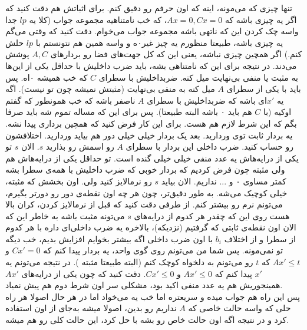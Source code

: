 تنها چیزی که می‌مونه، اینه که اون حرفم رو دقیق کنم. برای اثباتش هم دقت کنید که اگر یه چیزی باشه که $Ax=0, Cx=0$، که خب نامتناهیه مجموعه جواب (کلا یه $lp$ جدا واسه چک کردن این که ناتهی باشه مجموعه جواب می‌خوام. دقت کنید که وقتی می‌گم یه چیزی باشه، طبیعتا منظورم یه چیز غیر۰ه و واسه همین هم نتونستم با $lp$ حلش کنم.) اگر همچین چیزی نباشه، یعنی این که کل جهت‌های فضا رو بردار‌های
$A, C$
پوشش می‌دند. در نتیجه برای این که نامتناهی بشه، باید ضرب داخلیش با حداقل یکی از این‌ها به مثبت یا منفی بی‌نهایت میل کنه.
ضربداخلیش با سطرای $C$ که خب همیشه ۰اه. پس باید با یکی از سطرای $A$ میل کنه به منفی بی‌نهایت (مثبتش نمیشه چون تو  نیست). اگه یه $x'$ای باشه که ضربداخلیش با سطرای $A$ ناصفر باشه که خب همونطور که گفتم اوکیه (با $C$ هم باید ۰ باشه البته طبیعتا). پس برای این که مساله تموم شه باید صرفا بگم که این شرط لازم هم هست. برای این کار فرض کنید که همچین برداری پیدا نشه. یه بردار ثابت توی
وردارید. بعد یک بردار خیلی خیلی دور هم بیاید وردارید. اختلافشون رو حساب کنید. ضرب داخلی این بردار با سطرای $A$ رو اسمش رو بذارید $s$. الان $s$ تو یکی از درایه‌هاش یه عدد منفی خیلی خیلی گنده است. تو حداقل یکی از درایه‌هاش هم ولی مثبته چون فرض کردیم که بردار خوبی که ضرب داخلیش با همه‌ی سطرا بشه کمتر مساوی ۰ و ... نداریم. الان بیاید $s$ رو نرمالایز کنید ولی. اون بخشش که مثبته، خیلی کوچیک می‌شه. به طور دقیق‌تر، چون هر چه اون نقطه‌ی دور رو دورتر بگیرم، می‌تونم نرم رو بیشتر کنم. از طرفی دقت کنید که قبل از نرمالایز کردن، کران بالا هست روی این که چقدر هر کدوم از درایه‌های $s$ می‌تونه مثبت باشه به خاطر این که الان اون نقطه‌ی ثابتی که گرفتیم (نزدیکه)، بالاخره یه ضرب داخلی‌ای داره با هر کدوم از سطرا و از اختلاف
$b_i$
با اون ضرب داخلی‌ اگه بیشتر بخوایم افزایش بدیم، خب دیگه تو 
نمی‌مونه. پس شما من می‌تونم روی گوی واحد، یه بردار پیدا کنم که 
$Cx'=0$
و
$Ax' \le t$
که $t$ رو می‌تونم به دلخواه کوچک کنم (البته طبیعتا مثبته ). در نتیجه می‌تونم یه $x'$ پیدا کنم که 
$Ax' \le 0$
و
$Cx' \le 0$.
دقت کنید که چون یکی از درایه‌های
$Ax'$
همینجوریش هم یه عدد منفی اکید بود، مشکلی سر اون شرط دوم هم پیش نمیاد.\\
پس این راه هم جواب میده و سریعتره اما خب یه 
می‌خواد اما در هر حال  اصولا هر راه حلی که واسه حالت خاصی که
$A$
نداریم رو بدین، اصولا میشه به‌جای 
از اون استفاده کرد و در نتیجه اگه اون حالت خاص رو بشه با
حل کرد، این حالت کلی رو هم میشه.

